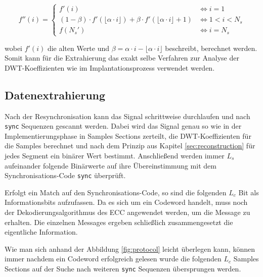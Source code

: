 	\begin{equation}
		f''(i) = \begin{cases}
    	 	f'(i) & \iff i = 1	
			\\
			(1-\beta) \cdot f'(\lfloor\alpha \cdot i\rfloor) + \beta \cdot f'(\lfloor\alpha \cdot i\rfloor + 1) & \iff 1 < i < {N}_{s} 
			\\
    		f({N}_{s}') & \iff i = {N}_{s}
  		 \end{cases}
		\label{equ:lagrange_interpolation}
	\end{equation}
	
wobei $f'(i)$ die alten Werte und $\beta = \alpha \cdot i - \lfloor \alpha \cdot i \rfloor$ beschreibt, berechnet werden. Somit kann für die Extrahierung das exakt selbe Verfahren zur Analyse der DWT-Koeffizienten wie im Implantationsprozess verwendet werden. 

\subsection{Datenextrahierung}

Nach der Resynchronisation kann das Signal schrittweise durchlaufen und nach \texttt{sync} Sequenzen gescannt werden. Dabei wird das Signal genau so wie in der Implementierungsphase in Samples Sections zerteilt, die DWT-Koeffizienten für die Samples berechnet und nach dem Prinzip aus Kapitel \ref{sec:reconstruction} für jedes Segment ein binärer Wert bestimmt. Anschließend werden immer $L_s$ aufeinander folgende Binärwerte auf ihre Übereinstimmung mit dem Synchronisations-Code \texttt{sync} überprüft.

Erfolgt ein Match auf den Synchronisations-Code, so sind die folgenden $L_c$ Bit als Informationsbits aufzufassen. Da es sich um ein Codeword handelt, muss noch der Dekodierungsalgorithmus des ECC angewendet werden, um die Message zu erhalten. Die einzelnen Messages ergeben schließlich zusammengesetzt die eigentliche Information. 

Wie man sich anhand der Abbildung \ref{fig:protocol} leicht überlegen kann, können immer nachdem ein Codeword erfolgreich gelesen wurde die folgenden $L_c$ Samples Sections  auf der Suche nach weiteren \texttt{sync} Sequenzen übersprungen werden.




